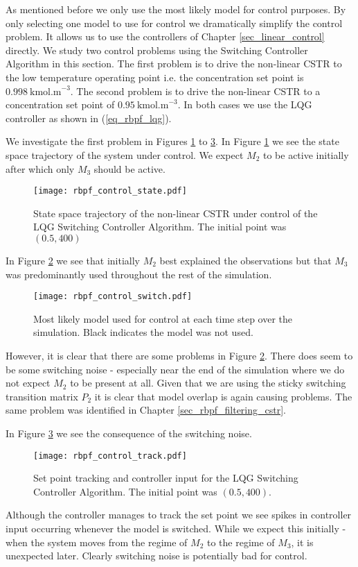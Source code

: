 As mentioned before we only use the most likely model for control purposes. By only selecting one model to use for control we dramatically simplify the control problem. It allows us to use the controllers of Chapter \ref{sec_linear_control} directly. We study two control problems using the Switching Controller Algorithm in this section. The first problem is to drive the non-linear CSTR to the low temperature operating point i.e. the concentration set point is $0.998~\text{kmol.m}^{-3}$. The second problem is to drive the non-linear CSTR to a concentration set point of $0.95~\text{kmol.m}^{-3}$. In both cases we use the LQG controller as shown in (\ref{eq_rbpf_lqg}).

We investigate the first problem in Figures \ref{fig_rbpf_control_state} to \ref{fig_rbpf_control_track}. In Figure \ref{fig_rbpf_control_state} we see the state space trajectory of the system under control. We expect $M_2$ to be active initially after which only $M_3$ should be active.
\begin{figure}[H] 
\centering
\texttt{[image: rbpf\_control\_state.pdf]}
\caption{State space trajectory of the non-linear CSTR under control of the LQG Switching Controller Algorithm. The initial point was $(0.5, 400)$}
\label{fig_rbpf_control_state}
\end{figure}
In Figure \ref{fig_rbpf_control_switch} we see that initially $M_2$ best explained the observations but that $M_3$ was predominantly used throughout the rest of the simulation.   
\begin{figure}[H] 
\centering
\texttt{[image: rbpf\_control\_switch.pdf]}
\caption{Most likely model used for control at each time step over the simulation. Black indicates the model was not used.}
\label{fig_rbpf_control_switch}
\end{figure}
However, it is clear that there are some problems in Figure \ref{fig_rbpf_control_switch}. There does seem to be some switching noise - especially near the end of the simulation where we do not expect $M_2$ to be present at all. Given that we are using the sticky switching transition matrix $P_2$ it is clear that model overlap is again causing problems. The same problem was identified in Chapter \ref{sec_rbpf_filtering_cstr}.

In Figure \ref{fig_rbpf_control_track} we see the consequence of the switching noise.
\begin{figure}[H] 
\centering
\texttt{[image: rbpf\_control\_track.pdf]}
\caption{Set point tracking and controller input for the LQG Switching Controller Algorithm. The initial point was $(0.5, 400)$.}
\label{fig_rbpf_control_track}
\end{figure}
Although the controller manages to track the set point we see spikes in controller input occurring whenever the model is switched. While we expect this initially - when the system moves from the regime of $M_2$ to the regime of $M_3$, it is unexpected later. Clearly switching noise is potentially bad for control.

